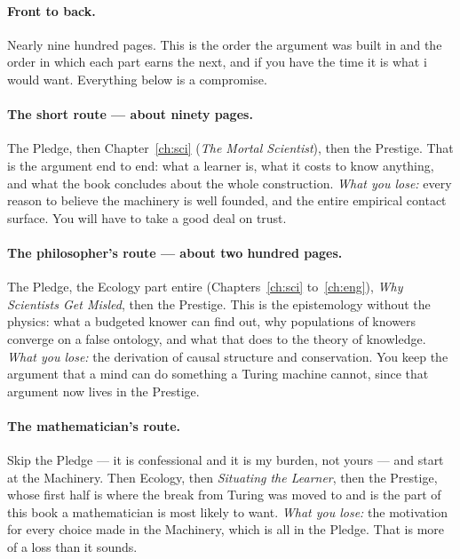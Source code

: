 \paragraph{Front to back.}
Nearly nine hundred pages.
This is the order the argument was built in and the order in which
each part earns the next, and if you have the time it is what i
would want.
Everything below is a compromise.

\paragraph{The short route --- about ninety pages.}
The Pledge, then Chapter~\ref{ch:sci} (\emph{The Mortal
Scientist}), then the Prestige.
That is the argument end to end: what a learner is, what it costs
to know anything, and what the book concludes about the whole
construction.
\emph{What you lose:} every reason to believe the machinery is well
founded, and the entire empirical contact surface.
You will have to take a good deal on trust.

\paragraph{The philosopher's route --- about two hundred pages.}
The Pledge, the Ecology part entire (Chapters~\ref{ch:sci}
to~\ref{ch:eng}), \emph{Why Scientists Get Misled}, then the
Prestige.
This is the epistemology without the physics: what a budgeted
knower can find out, why populations of knowers converge on a false
ontology, and what that does to the theory of knowledge.
\emph{What you lose:} the derivation of causal structure and
conservation.
You keep the argument that a mind can do something a Turing machine
cannot, since that argument now lives in the Prestige.

\paragraph{The mathematician's route.}
Skip the Pledge --- it is confessional and it is my burden, not
yours --- and start at the Machinery.
Then Ecology, then \emph{Situating the Learner}, then the Prestige,
whose first half is where the break from Turing was moved to and is the
part of this book a mathematician is most likely to want.
\emph{What you lose:} the motivation for every choice made in the
Machinery, which is all in the Pledge.
That is more of a loss than it sounds.

